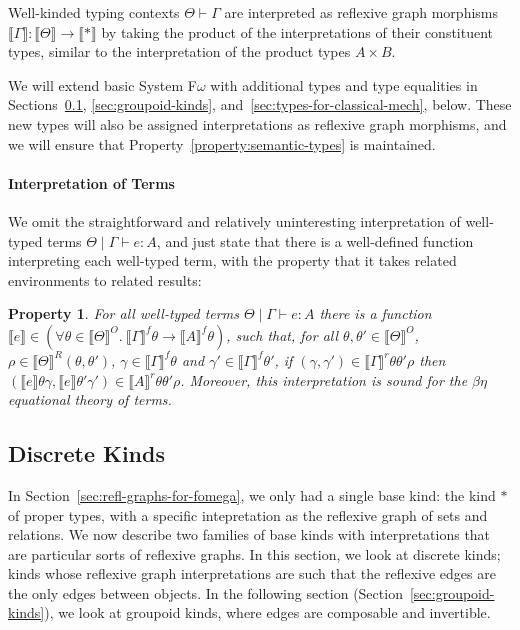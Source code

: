 \documentclass[preprint]{sigplanconf}
\newcommand{\sepbar}{\mathrel|}
\newtheorem{property}{Property}
\theoremstyle{examplestyle}
\newcommand{\sem}[1]{\llbracket #1 \rrbracket}
\newcommand{\semKU}[1]{\llbracket #1 \rrbracket^O}
\newcommand{\semKR}[1]{\llbracket #1 \rrbracket^R}
\begin{document}
Well-kinded typing contexts $\Theta \vdash \Gamma$ are interpreted as
reflexive graph morphisms $\sem{\Gamma} : \sem{\Theta} \to \sem{*}$ by
taking the product of the interpretations of their constituent types,
similar to the interpretation of the product types $A \times B$.

We will extend basic System F$\omega$ with additional types and type
equalities in Sections~\ref{sec:discrete-kinds},
\ref{sec:groupoid-kinds}, and~\ref{sec:types-for-classical-mech},
below. These new types will also be assigned interpretations as
reflexive graph morphisms, and we will ensure that
Property~\ref{property:semantic-types} is maintained.

\paragraph{Interpretation of Terms} We omit the straightforward and
relatively uninteresting interpretation of well-typed terms $\Theta
\sepbar \Gamma \vdash e : A$, and just state that there is a
well-defined function interpreting each well-typed term, with the
property that it takes related environments to related results:

\begin{property}
  For all well-typed terms $\Theta \sepbar \Gamma \vdash e : A$ there
  is a function $\sem{e} \in (\forall \theta \in \semKU{\Theta}.\
  \sem{\Gamma}^f\theta \to \sem{A}^f\theta)$, such that, for all
  $\theta, \theta' \in \semKU{\Theta}$, $\rho \in
  \semKR{\Theta}(\theta,\theta')$, $\gamma \in \sem{\Gamma}^f\theta$
  and $\gamma' \in \sem{\Gamma}^f\theta'$, if $(\gamma, \gamma') \in
  \sem{\Gamma}^r\theta\theta'\rho$ then $(\sem{e}\theta\gamma,
  \sem{e}\theta'\gamma') \in \sem{A}^r\theta\theta'\rho$.  Moreover,
  this interpretation is sound for the $\beta\eta$ equational theory
  of terms.
\end{property}

\subsection{Discrete Kinds}
\label{sec:discrete-kinds}

In Section~\ref{sec:refl-graphs-for-fomega}, we only had a single base
kind: the kind $*$ of proper types, with a specific intepretation as
the reflexive graph of sets and relations. We now describe two
families of base kinds with interpretations that are particular sorts
of reflexive graphs. In this section, we look at discrete kinds; kinds
whose reflexive graph interpretations are such that the reflexive
edges are the only edges between objects. In the following section
(Section~\ref{sec:groupoid-kinds}), we look at groupoid kinds, where
edges are composable and invertible.
\end{document}
